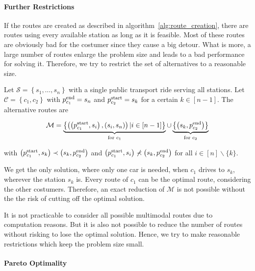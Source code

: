 \paragraph{Further Restrictions} \parfill

If the routes are created as described in algorithm~\ref{alg:route_creation}, there are routes using every available station as long as it is feasible. Most of these routes are obviously bad for the costumer since they cause a big detour. What is more, a large number of routes enlarge the problem size and leads to  a bad performance for solving it. Therefore, we try to restrict the set of alternatives to a reasonable size.

\begin{example}

Let $\mathcal{S}=\left\{s_1,\dots,s_n\right\}$ with a single public transport ride serving all stations. Let $\mathcal{C}=\left\{c_1,c_2\right\}$ with $p^{\operatorname{end}}_{c_1}=s_n$ and $p^{\operatorname{start}}_{c_2}=s_k$ for a certain $k\in[n-1]$. The alternative routes are

\begin{align*}
	\mathcal{M} = \underbrace{\left\{\left(\left(p^{\operatorname{start}}_{c_1},s_i\right),\left(s_i,s_n\right)\right)|i\in[n-1]\right\}}_{\text{for }c_1}\cup\underbrace{\left\{\left(s_k,p^{\operatorname{end}}_{c_2}\right)\right\}}_{\text{for }c_2}
\end{align*}

with $\left(p^{\operatorname{start}}_{c_1},s_k\right)\prec\left(s_k,p^{\operatorname{end}}_{c_2}\right)$ and $\left(p^{\operatorname{start}}_{c_1},s_i\right)\not\prec\left(s_k,p^{\operatorname{end}}_{c_2}\right)$ for all $i\in[n]\backslash\{k\}$. 

We get the only solution, where only one car is needed, when $c_1$ drives to $s_k$, wherever the station $s_k$ is. Every route of $c_1$ can be the optimal route, considering the other costumers. Therefore, an exact reduction of $\mathcal{M}$ is not possible without the the risk of cutting off the optimal solution.
	
\end{example}

It is not practicable to consider all possible multimodal routes due to computation reasons. But it is also not possible to reduce the number of routes without risking to lose the optimal solution. Hence, we try to make reasonable restrictions which keep the problem size small.

\paragraph{Pareto Optimality} \parfill

